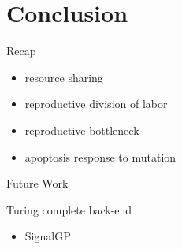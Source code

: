 \section{Conclusion}

\begin{frame}{Recap}

\Large

\begin{itemize}
\item resource sharing
\item reproductive division of labor
\item reproductive bottleneck
\item apoptosis response to mutation
\end{itemize}

\end{frame}

\begin{frame}{Future Work}

\Large

Turing complete back-end
\begin{itemize}
\item SignalGP \cite{lalejini2018evolving}
\end{itemize}

\end{frame}

